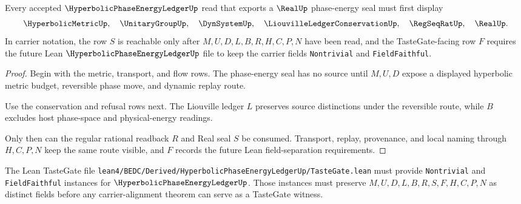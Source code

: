 \begin{theorem}
\label{thm:hyperbolic-phase-energy-ledger-real-seal-order}
Every accepted $\HyperbolicPhaseEnergyLedgerUp$ read that exports a $\RealUp$ phase-energy seal must first display
$$
\HyperbolicMetricUp,\quad \UnitaryGroupUp,\quad \DynSystemUp,\quad \LiouvilleLedgerConservationUp,\quad \RegSeqRatUp,\quad \RealUp .
$$
In carrier notation, the row $S$ is reachable only after $M,U,D,L,B,R,H,C,P,N$ have been read, and the TasteGate-facing row $F$ requires the future Lean $\HyperbolicPhaseEnergyLedgerUp$ file to keep the carrier fields \texttt{Nontrivial} and \texttt{FieldFaithful}.
\end{theorem}
\begin{proof}
Begin with the metric, transport, and flow rows. The phase-energy seal has no source until $M,U,D$ expose a displayed hyperbolic metric budget, reversible phase move, and dynamic replay route.

Use the conservation and refusal rows next. The Liouville ledger $L$ preserves source distinctions under the reversible route, while $B$ excludes host phase-space and physical-energy readings.

Only then can the regular rational readback $R$ and Real seal $S$ be consumed. Transport, replay, provenance, and local naming through $H,C,P,N$ keep the same route visible, and $F$ records the future Lean field-separation requirements.
\end{proof}



The Lean TasteGate file \texttt{lean4/BEDC/Derived/HyperbolicPhaseEnergyLedgerUp/TasteGate.lean} must provide \texttt{Nontrivial} and \texttt{FieldFaithful} instances for $\HyperbolicPhaseEnergyLedgerUp$. Those instances must preserve $M,U,D,L,B,R,S,F,H,C,P,N$ as distinct fields before any carrier-alignment theorem can serve as a TasteGate witness.


